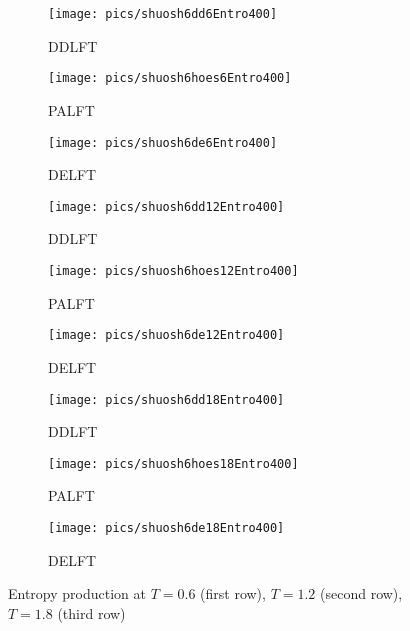 	\begin{figure}
		\begin{subfigure}{0.32\textwidth}
			\texttt{[image: pics/shuosh6dd6Entro400]}
			\caption{DDLFT}
		\end{subfigure}
		\begin{subfigure}{0.32\textwidth}
			\texttt{[image: pics/shuosh6hoes6Entro400]}
			\caption{PALFT}
		\end{subfigure}
		\begin{subfigure}{0.32\textwidth}
			\texttt{[image: pics/shuosh6de6Entro400]}
			\caption{DELFT}
		\end{subfigure}
		\begin{subfigure}{0.32\textwidth}
			\texttt{[image: pics/shuosh6dd12Entro400]}
			\caption{DDLFT}
		\end{subfigure}
		\begin{subfigure}{0.32\textwidth}
			\texttt{[image: pics/shuosh6hoes12Entro400]}
			\caption{PALFT}
		\end{subfigure}
		\begin{subfigure}{0.32\textwidth}
			\texttt{[image: pics/shuosh6de12Entro400]}
			\caption{DELFT}
		\end{subfigure}
		\begin{subfigure}{0.32\textwidth}
			\texttt{[image: pics/shuosh6dd18Entro400]}
			\caption{DDLFT}
		\end{subfigure}
		\begin{subfigure}{0.32\textwidth}
			\texttt{[image: pics/shuosh6hoes18Entro400]}
			\caption{PALFT}
		\end{subfigure}
		\begin{subfigure}{0.32\textwidth}
			\texttt{[image: pics/shuosh6de18Entro400]}
			\caption{DELFT}
		\end{subfigure}
		
		\caption{Entropy production at $T = 0.6$ (first row), $T = 1.2$ (second row), $T = 1.8$ (third row)}
		\label{fig:SO7}
	\end{figure}	
	
